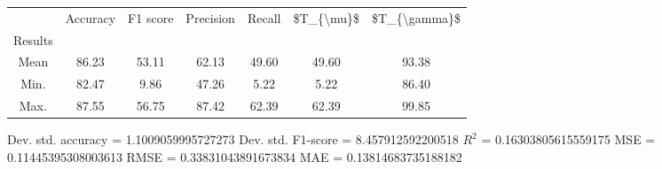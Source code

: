 \begin{tabular}{|c|c|c|c|c|c|c|}
\toprule
{} &  Accuracy &  F1 score &  Precision &  Recall &  \$T\_\{\textbackslash mu\}\$ &  \$T\_\{\textbackslash gamma\}\$ \\
Results &           &           &            &         &            &               \\
\hline
Mean    &     86.23 &     53.11 &      62.13 &   49.60 &      49.60 &         93.38 \\
Min.    &     82.47 &      9.86 &      47.26 &    5.22 &       5.22 &         86.40 \\
Max.    &     87.55 &     56.75 &      87.42 &   62.39 &      62.39 &         99.85 \\
\bottomrule
\end{tabular}

 Dev. std. accuracy = 1.1009059995727273
 Dev. std. F1-score = 8.457912592200518
 $R^2$ = 0.16303805615559175
 MSE = 0.11445395308003613
 RMSE = 0.33831043891673834
 MAE = 0.13814683735188182